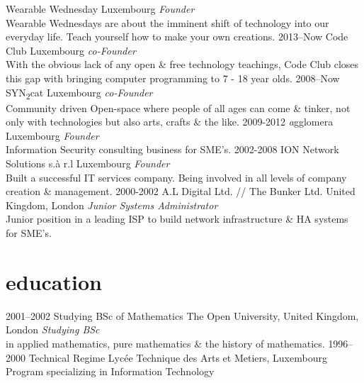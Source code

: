 \documentclass[]{friggeri-cv} %
\begin{document}
\begin{entrylist}
{Wearable Wednesday}
{Luxembourg}
{\emph{Founder} \\
Wearable Wednesdays are about the imminent shift of technology into our everyday life. Teach yourself how to make your own creations.}
\entry
{2013--Now}
{Code Club}
{Luxembourg}
{\emph{co-Founder} \\
With the obvious lack of any open \& free technology teachings, Code Club closes this gap with bringing computer programming to 7 - 18 year olds.}
\entry
{2008--Now}
{SYN\textsubscript{2}cat}
{Luxembourg}
{\emph{co-Founder} \\
Community driven Open-space where people of all ages can come \& tinker, not only with technologies but also arts, crafts \& the like.}
\entry
{2009-2012}
{\emph{a}gglomera}
{Luxembourg}
{\emph{Founder} \\
Information Security consulting business for SME's.}
\entry
{2002-2008}
{ION Network Solutions s.\`{a} r.l}
{Luxembourg}
{\emph{Founder} \\
Built a successful IT services company. Being involved in all levels of company creation \& management.}
\entry
{2000-2002}
{A.L Digital Ltd. // The Bunker Ltd.}
{United Kingdom, London}
{\emph{Junior Systems Administrator} \\
Junior position in a leading ISP to build network infrastructure \& HA systems for SME's.}
\end{entrylist}

\newpage


\section{education}
\begin{entrylist}
\entry
{2001--2002}
{Studying BSc {\normalfont of Mathematics}}
{The Open University, United Kingdom, London}
{\emph{Studying BSc} \\ in applied mathematics, pure mathematics \& the history of mathematics.}
\entry
{1996--2000}
{Technical Regime}
{Lyc\'{e}e Technique des Arts et Metiers, Luxembourg}
{Program specializing in Information Technology}
\end{entrylist}
\end{document}
